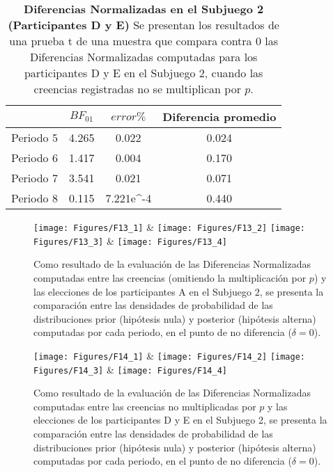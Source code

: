 \begin{table}[h]
\caption[Diferencias Normalizadas en el Subjuego 2, omitiendo la multiplicación por $p$; Participantes D y E (Pruebas t de una muestra)]{\textbf{Diferencias Normalizadas en el Subjuego 2 (Participantes D y E)} Se presentan los resultados de una prueba t de una muestra que compara contra 0 las Diferencias Normalizadas computadas para los participantes D y E en el Subjuego 2, cuando las creencias registradas no se multiplican por $p$.}
\label{DNnop-S2-DyE-B}
\centering
\begin{tabular}{l | c c | c}
\toprule
\textbf{} & \textbf{$BF_{01}$} & \textbf{$error\%$} & \textbf{Diferencia promedio}\\
\midrule
Periodo 5 & 4.265 & 0.022 & 0.024\\
Periodo 6 & 1.417 & 0.004 & 0.170\\
Periodo 7 & 3.541 & 0.021 & 0.071\\
Periodo 8 & 0.115 & 7.221e^-4 & 0.440\\
\bottomrule
\end{tabular}
\end{table}
  

\begin{figure}[hp]
\centering
\texttt{[image: Figures/F13\_1]} & \texttt{[image: Figures/F13\_2]} 
\texttt{[image: Figures/F13\_3]} & \texttt{[image: Figures/F13\_4]} 
\decoRule
\caption[Evaluación de las Diferencias Normalizadas entre creencias (sin multiplicar por $p$) y elecciones en los participantes A en el Subjuego 2 (Factor de Bayes)]{Como resultado de la evaluación de las Diferencias Normalizadas computadas entre las creencias (omitiendo la multiplicación por $p$) y las elecciones de los participantes A en el Subjuego 2, se presenta la comparación entre las densidades de probabilidad de las distribuciones prior (hipótesis nula) y posterior (hipótesis alterna) computadas por cada periodo, en el punto de no diferencia ($\delta = 0$).}
\label{fig:DNnop_S2_A}
\end{figure}  


\begin{figure}[hp]
\centering
\texttt{[image: Figures/F14\_1]} & \texttt{[image: Figures/F14\_2]} 
\texttt{[image: Figures/F14\_3]} & \texttt{[image: Figures/F14\_4]} 
\decoRule
\caption[Evaluación de las Diferencias Normalizadas entre creencias y elecciones en los participantes D y E en el Subjuego 2 (Factor de Bayes)]{Como resultado de la evaluación de las Diferencias Normalizadas computadas entre las creencias no multiplicadas por $p$ y las elecciones de los participantes D y E en el Subjuego 2, se presenta la comparación entre las densidades de probabilidad de las distribuciones prior (hipótesis nula) y posterior (hipótesis alterna) computadas por cada periodo, en el punto de no diferencia ($\delta = 0$).}
\label{fig:DNnop_S2_DyE}
\end{figure}  

